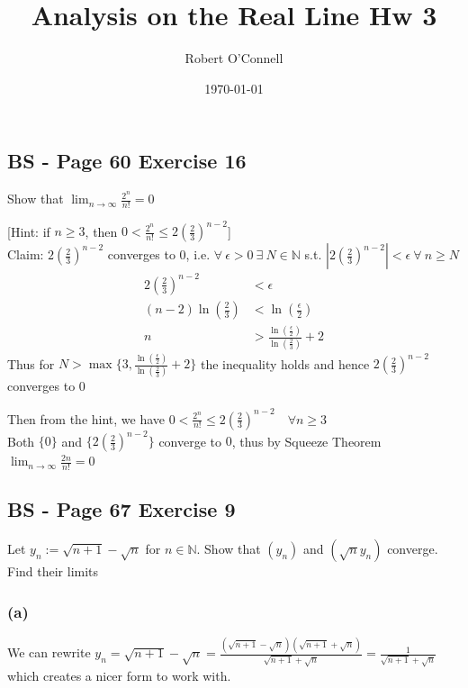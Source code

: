 \documentclass{article}
\title{\textbf{Analysis on the Real Line Hw 3}}
\author{Robert O'Connell}
\date{\today}
\begin{document}
\maketitle
\vspace{5mm}

\subsection*{BS - Page 60 Exercise 16}
Show that \(\lim_{n\to\infty}{\frac{2^n}{n!}} = 0\)

[Hint: if \(n \geq 3\), then \(0 < \frac{2^n}{n!} \leq 2(\frac{2}{3})^{n-2}\)]
\\

Claim: \(2(\frac{2}{3})^{n-2}\) converges to \(0\), i.e. \(\forall \ \epsilon > 0 \ \exists \ N \in \mathbb{N}\) s.t. 
\(|2(\frac{2}{3})^{n-2}| < \epsilon \ \forall \ n \geq N\) 
\begin{align*} 
    2\left(\frac{2}{3}\right)^{n-2} &< \epsilon \\
    (n-2)\ln(\frac{2}{3}) &<\ln(\frac{\epsilon}{2}) \\
    n &> \frac{\ln(\frac{\epsilon}{2})}{\ln(\frac{2}{3})} + 2
\end{align*}
Thus for \(N > \max\{3, \frac{\ln(\frac{\epsilon}{2})}{\ln(\frac{2}{3})} + 2\}\) the inequality holds and hence
\(2(\frac{2}{3})^{n-2}\) converges to \(0\)

Then from the hint, we have \(0 < \frac{2^n}{n!} \leq 2(\frac{2}{3})^{n-2} \quad \forall n \geq 3\)
\\

Both \(\{0\}\) and \(\{2(\frac{2}{3})^{n-2}\}\) converge to \(0\), thus by Squeeze Theorem
\(\lim_{n\to\infty}{\frac{2n}{n!}} = 0\)

\subsection*{BS - Page 67 Exercise 9}
Let \(y_n := \sqrt{n+1}- \sqrt{n}\) for \(n \in \mathbb{N}\). Show that \((y_n)\) 
and \((\sqrt{n}y_n)\) converge. Find their limits
\\

\subsubsection*{(a)}
We can rewrite \(y_n = \sqrt{n+1} - \sqrt{n} = \frac{(\sqrt{n+1} - \sqrt{n})(\sqrt{n+1} + \sqrt{n})}{\sqrt{n+1} + \sqrt{n}} 
= \frac{1}{\sqrt{n+1} + \sqrt{n}} \) which creates a nicer form to work with.
\end{document}
